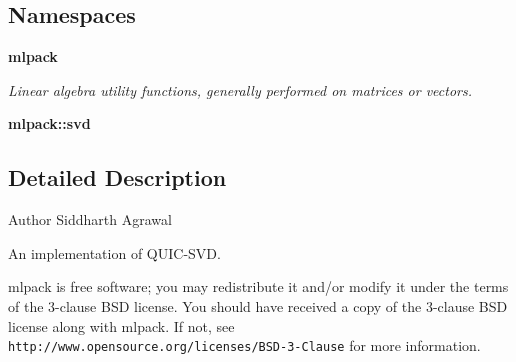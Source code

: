 \subsection*{Namespaces}
\begin{DoxyCompactItemize}
\item 
 \textbf{ mlpack}
\begin{DoxyCompactList}\small\item\em Linear algebra utility functions, generally performed on matrices or vectors. \end{DoxyCompactList}\item 
 \textbf{ mlpack\+::svd}
\end{DoxyCompactItemize}


\subsection{Detailed Description}
\begin{DoxyAuthor}{Author}
Siddharth Agrawal
\end{DoxyAuthor}
An implementation of Q\+U\+I\+C-\/\+S\+VD.

mlpack is free software; you may redistribute it and/or modify it under the terms of the 3-\/clause B\+SD license. You should have received a copy of the 3-\/clause B\+SD license along with mlpack. If not, see {\tt http\+://www.\+opensource.\+org/licenses/\+B\+S\+D-\/3-\/\+Clause} for more information. 